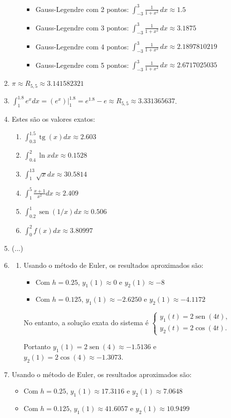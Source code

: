 \documentclass[12pt,a4paper]{article}
\newcommand{\fixme}{{\color{red}(...)}}
\newcommand*\sen{\operatorname{sen}}
\newcommand*\tg{\operatorname{tg}}
\begin{document}
\begin{enumerate}
\begin{enumerate}
\begin{itemize}
\item Gauss-Legendre com 2 pontos: $\int_{-3}^3 \frac{1}{1+x^2} \,dx \approx 1.5$
\item Gauss-Legendre com 3 pontos: $\int_{-3}^3 \frac{1}{1+x^2} \,dx \approx 3.1875$ 
\item Gauss-Legendre com 4 pontos: $\int_{-3}^3 \frac{1}{1+x^2} \,dx \approx 2.1897810219$
\item Gauss-Legendre com 5 pontos: $\int_{-3}^3 \frac{1}{1+x^2} \,dx \approx 2.6717025035$
\end{itemize}
\end{enumerate}
\item $\pi \approx R_{5,5} \approx 3.141582321$
\item $\int_1^{1.8} e^x dx
= \left(e^x \right)\Big|_{1}^{1.8}
= e^{1.8} - e
\approx R_{5,5}
\approx 3.331365637$.
\item Estes são os valores exatos:
\begin{enumerate}
\item $\int_{0.3}^{1.5} \tg(x) dx \approx 2.603$
\item $\int_{0.4}^{2} \ln{x} dx \approx 0.1528$
\item $\int_{1}^{13} \sqrt{x} dx \approx 30.5814$
\item $\int_1^5 \frac{x+1}{x^2} dx \approx 2.409$
\item $\int_{0.2}^{1} \sen(1/x) dx \approx 0.506$
\item $\int_{0}^{2} f(x) dx \approx 3.80997$
\end{enumerate}
\item \fixme
\item \begin{enumerate}
\item Usando o método de Euler, os resultados aproximados são:
\begin{itemize}
\item Com $h=0.25$, $y_1(1) \approx 0$ e $y_2(1) \approx -8$
\item Com $h=0.125$, $y_1(1) \approx -2.6250$ e $y_2(1) \approx -4.1172$
\end{itemize}

No entanto, a solução exata do sistema é
$\begin{cases}
y_1(t) = 2\sen(4t),\\
y_2(t) = 2\cos(4t).
\end{cases}$

Portanto $y_1(1) = 2\sen(4) \approx -1.5136$ e $y_2(1) = 2\cos(4) \approx -1.3073$.

\end{enumerate}
\item Usando o método de Euler, os resultados aproximados são:
\begin{itemize}
\item Com $h=0.25$, $y_1(1) \approx 17.3116$ e $y_2(1) \approx 7.0648$
\item Com $h=0.125$, $y_1(1) \approx 41.6057$ e $y_2(1) \approx 10.9499$
\end{itemize}

\end{enumerate}
\end{document}
